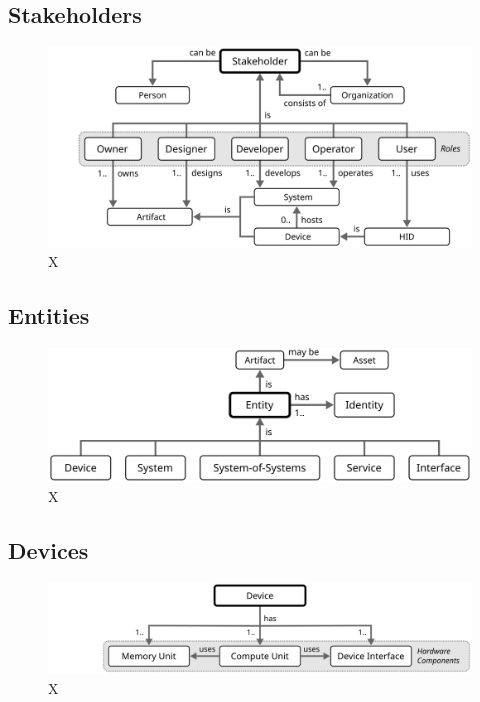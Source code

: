 \subsection{Stakeholders}

\begin{figure}[ht!]
  \centering
  \includegraphics{figures/stakeholder}
  \caption{
    X
  }
  \label{fig:stakeholder}
\end{figure}

\subsection{Entities}

\begin{figure}[ht!]
  \centering
  \includegraphics{figures/entity}
  \caption{
    X
  }
  \label{fig:entity}
\end{figure}

\subsection{Devices}

\begin{figure}[ht!]
  \centering
  \includegraphics{figures/device}
  \caption{
    X
  }
  \label{fig:device}
\end{figure}

